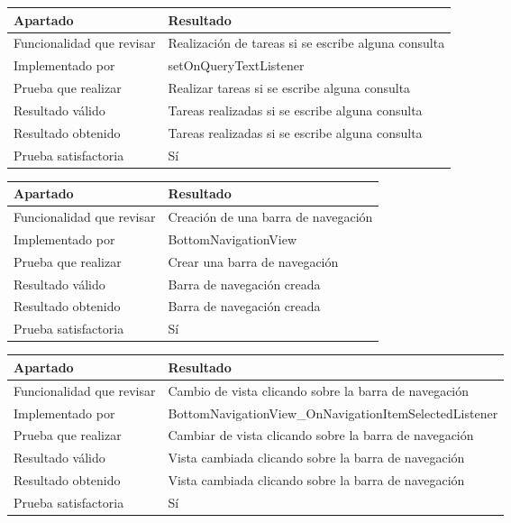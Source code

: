 \bigskip

\begin{center}
    \begin{tabulary}{0.8\textwidth}{L|L}
        \textbf{Apartado} & \textbf{Resultado} \\ \hline
        Funcionalidad que revisar & Realización de tareas si se escribe alguna consulta \\
        Implementado por & setOnQueryTextListener \\
        Prueba que realizar & Realizar tareas si se escribe alguna consulta \\
        Resultado válido & Tareas realizadas si se escribe alguna consulta \\
        Resultado obtenido & Tareas realizadas si se escribe alguna consulta \\
        Prueba satisfactoria & Sí \\
    \end{tabulary}
\end{center}

\bigskip

\begin{center}
    \begin{tabulary}{0.8\textwidth}{L|L}
        \textbf{Apartado} & \textbf{Resultado} \\ \hline
        Funcionalidad que revisar & Creación de una barra de navegación \\
        Implementado por & BottomNavigationView \\
        Prueba que realizar & Crear una barra de navegación \\
        Resultado válido & Barra de navegación creada \\
        Resultado obtenido & Barra de navegación creada \\
        Prueba satisfactoria & Sí \\
    \end{tabulary}
\end{center}

\bigskip

\begin{center}
    \begin{tabulary}{0.8\textwidth}{L|L}
        \textbf{Apartado} & \textbf{Resultado} \\ \hline
        Funcionalidad que revisar & Cambio de vista clicando sobre la barra de navegación \\
        Implementado por & BottomNavigationView\_OnNavigationItemSelectedListener \\
        Prueba que realizar & Cambiar de vista clicando sobre la barra de navegación \\
        Resultado válido & Vista cambiada clicando sobre la barra de navegación \\
        Resultado obtenido & Vista cambiada clicando sobre la barra de navegación \\
        Prueba satisfactoria & Sí \\
    \end{tabulary}
\end{center}

